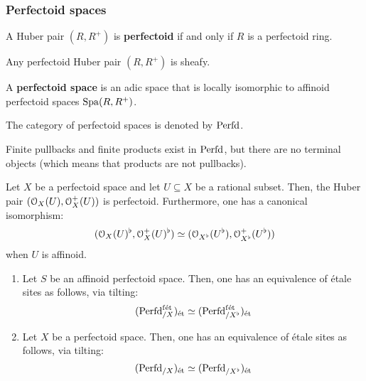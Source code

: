             \subsubsection{Perfectoid spaces}
                \begin{definition} \label{def: perfectoid_huber_pairs}
                    A Huber pair $(R, R^+)$ is \textbf{perfectoid} if and only if $R$ is a perfectoid ring. 
                \end{definition}
                
                \begin{lemma} \label{lemma: perfectoid_huber_pairs_are_sheafy}
                    Any perfectoid Huber pair $(R, R^+)$ is sheafy.
                \end{lemma}
                \begin{definition} \label{def: perfectoid_spaces}
                    A \textbf{perfectoid space} is an adic space that is locally isomorphic to affinoid perfectoid spaces $\mathrm{Spa}(R, R^+)$. 
                    
                    The category of perfectoid spaces is denoted by $\mathrm{Perfd}$.
                \end{definition}
                \begin{proposition} \label{prop: pullbacks_products_of_perfectoid_spaces}
                    Finite pullbacks and finite products exist in $\mathrm{Perfd}$, but there are no terminal objects (which means that products are not pullbacks). 
                \end{proposition}
                
                \begin{proposition} \label{prop: tilting_glues}
                    Let $X$ be a perfectoid space and let $U \subseteq X$ be a rational subset. Then, the Huber pair $(\mathcal{O}_X(U), \mathcal{O}_X^+(U))$ is perfectoid. Furthermore, one has a canonical isomorphism:
                        $$(\mathcal{O}_X(U)^{\flat}, \mathcal{O}_X^+(U)^{\flat}) \simeq (\mathcal{O}_{X^{\flat}}(U^{\flat}), \mathcal{O}_{X^{\flat}}^+(U^{\flat}))$$
                    when $U$ is affinoid.
                \end{proposition}
                \begin{theorem} \label{theorem: the_tilting_equivalence}
                    \noindent
                    \begin{enumerate}
                        \item Let $S$ be an affinoid perfectoid space. Then, one has an equivalence of \'etale sites as follows, via tilting:
                        $$(\mathrm{Perfd}_{/X}^{\mathrm{f\acute{e}t}})_{\mathrm{\acute{e}t}} \simeq (\mathrm{Perfd}_{/X^{\flat}}^{\mathrm{f\acute{e}t}})_{\mathrm{\acute{e}t}}$$
                        \item Let $X$ be a perfectoid space. Then, one has an equivalence of \'etale sites as follows, via tilting:
                        $$(\mathrm{Perfd}_{/X})_{\mathrm{\acute{e}t}} \simeq (\mathrm{Perfd}_{/X^{\flat}})_{\mathrm{\acute{e}t}}$$
                    \end{enumerate}
                \end{theorem}